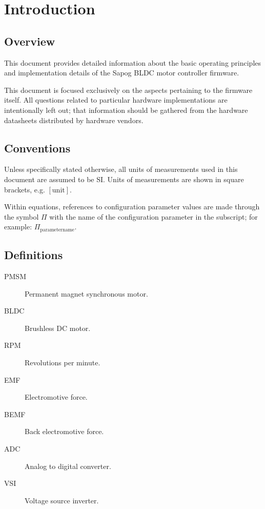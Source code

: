 \documentclass{zubaxdoc}
\begin{document}
\begin{titlepage}
\end{titlepage}

\tableofcontents
\listoffigures
\listoftables

\mainmatter

\chapter{Introduction}

\section{Overview}

This document provides detailed information about the basic operating principles and
implementation details of the Sapog BLDC motor controller firmware.

This document is focused exclusively on the aspects pertaining to the firmware itself.
All questions related to particular hardware implementations are intentionally left out;
that information should be gathered from the hardware datasheets distributed by
hardware vendors.

\section{Conventions}

Unless specifically stated otherwise, all units of measurements used in this document are assumed to be SI.
Units of measurements are shown in square brackets, e.g. $\left[\text{unit}\right]$.

Within equations, references to configuration parameter values are made through the symbol $\Pi$
with the name of the configuration parameter in the subscript;
for example: $\Pi_\text{parametername}$.

\section{Definitions}

\begin{description}
    \item[PMSM] Permanent magnet synchronous motor.
    \item[BLDC] Brushless DC motor.
    \item[RPM] Revolutions per minute.
    \item[EMF] Electromotive force.
    \item[BEMF] Back electromotive force.
    \item[ADC] Analog to digital converter.
    \item[VSI] Voltage source inverter.
\end{description}
\end{document}
